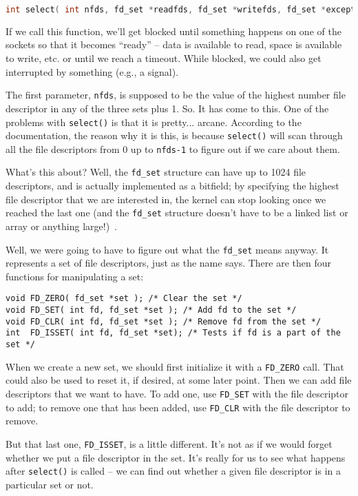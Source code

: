 \begin{lstlisting}[language=C]
 int select( int nfds, fd_set *readfds, fd_set *writefds, fd_set *exceptfds, struct timeval *timeout );
\end{lstlisting}

If we call this function, we'll get blocked until something happens on one of the sockets so that it becomes ``ready'' -- data is available to read, space is available to write, etc. or until we reach a timeout. While blocked, we could also get interrupted by something (e.g., a signal).

The first parameter, \texttt{nfds}, is supposed to be the value of the highest number file descriptor in any of the three sets plus 1. So. It has come to this. One of the problems with \texttt{select()} is that it is pretty... arcane. According to the documentation, the reason why it is this, is because \texttt{select()} will scan through all the file descriptors from 0 up to \texttt{nfds-1} to figure out if we care about them.

What's this about? Well, the \texttt{fd\_set} structure can have up to 1024 file descriptors, and is actually implemented as a bitfield; by specifying the highest file descriptor that we are interested in, the kernel can stop looking once we reached the last one (and the \texttt{fd\_set} structure doesn't have to be a linked list or array or anything large!)~\cite{apunix}.

Well, we were going to have to figure out what the \texttt{fd\_set} means anyway. It represents a set of file descriptors, just as the name says.  There are then four functions for manipulating a set:

\begin{lstlisting}
void FD_ZERO( fd_set *set ); /* Clear the set */
void FD_SET( int fd, fd_set *set ); /* Add fd to the set */
void FD_CLR( int fd, fd_set *set ); /* Remove fd from the set */
int  FD_ISSET( int fd, fd_set *set); /* Tests if fd is a part of the set */ 
\end{lstlisting}

When we create a new set, we should first initialize it with a \texttt{FD\_ZERO} call. That could also be used to reset it, if desired, at some later point. Then we can add file descriptors that we want to have. To add one, use \texttt{FD\_SET} with the file descriptor to add; to remove one that has been added, use \texttt{FD\_CLR} with the file descriptor to remove.

But that last one, \texttt{FD\_ISSET}, is a little different. It's not as if we would forget whether we put a file descriptor in the set. It's really for us to see what happens after \texttt{select()} is called -- we can find out whether a given file descriptor is in a particular set or not.


